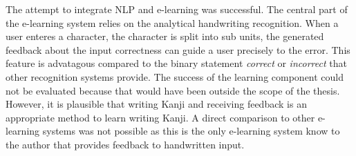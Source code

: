 The attempt to integrate NLP and e-learning was successful. The central part of
the e-learning system relies on the analytical handwriting recognition. 
When a user enteres a character, the character is split into sub units, 
the generated feedback about the input correctness can guide a user precisely 
to the error. This feature is advatagous compared to the binary statement 
\emph{correct} or \emph{incorrect} that other recognition systems provide.
The success of the learning component could not be evaluated because that would
have been outside the scope of the thesis. However, it is plausible that writing
Kanji and receiving feedback is an appropriate method to learn writing
Kanji. A direct comparison to other e-learning systems was not possible as this
is the only e-learning system know to the author that provides feedback to
handwritten input. 





